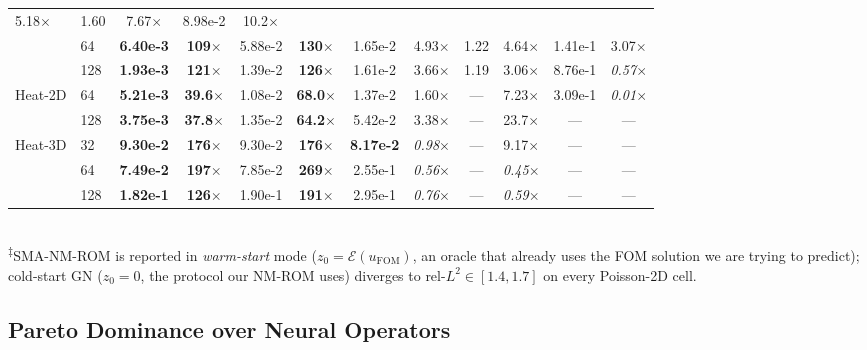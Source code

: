 \documentclass{article}
\begin{document}
\begin{table}[!htbp]
\begin{tabular}{llcccccccccc}
  5.18$\times$ & 1.60        & 7.67$\times$ & 8.98e-2 & 10.2$\times$ \\
    &  64 & \textbf{6.40e-3} & \textbf{109}$\times$  & 5.88e-2 & \textbf{130}$\times$ & 1.65e-2 &
  4.93$\times$ & 1.22        & 4.64$\times$ & 1.41e-1 & 3.07$\times$ \\
    & 128 & \textbf{1.93e-3} & \textbf{121}$\times$  & 1.39e-2 & \textbf{126}$\times$ & 1.61e-2 &
  3.66$\times$ & 1.19        & 3.06$\times$ & 8.76e-1 & \emph{0.57}$\times$ \\
  \midrule
  \multirow{2}{*}{Heat-2D}
    &  64 & \textbf{5.21e-3} & \textbf{39.6}$\times$  & 1.08e-2 & \textbf{68.0}$\times$  & 1.37e-2     &
  1.60$\times$        & ---        & 7.23$\times$ & 3.09e-1 & \emph{0.01}$\times$ \\
    & 128 & \textbf{3.75e-3} & \textbf{37.8}$\times$  & 1.35e-2 & \textbf{64.2}$\times$  & 5.42e-2     &
  3.38$\times$        & ---        & 23.7$\times$ & ---     & --- \\
  \midrule
  \multirow{3}{*}{Heat-3D}
    &  32 & \textbf{9.30e-2} & \textbf{176}$\times$   & 9.30e-2 & \textbf{176}$\times$   & \textbf{8.17e-2} &
  \emph{0.98}$\times$ & ---         & 9.17$\times$ & ---         & ---                 \\
    &  64 & \textbf{7.49e-2} & \textbf{197}$\times$   & 7.85e-2 & \textbf{269}$\times$   & 2.55e-1     &
  \emph{0.56}$\times$ & ---         & \emph{0.45}$\times$ & ---     & ---                 \\
    & 128 & \textbf{1.82e-1} & \textbf{126}$\times$   & 1.90e-1 & \textbf{191}$\times$   & 2.95e-1     &
  \emph{0.76}$\times$ & ---         & \emph{0.59}$\times$ & ---     & ---                 \\
  \bottomrule
  \end{tabular}
  \\[2pt]
  {\scriptsize \textsuperscript{$\ddagger$}SMA-NM-ROM \citep{KimChoi2022NMROM}
  is reported in \emph{warm-start} mode ($z_0=\mathcal{E}(u_\mathrm{FOM})$,
  an oracle that already uses the FOM solution we are trying to predict);
  cold-start GN ($z_0=0$, the protocol our NM-ROM uses) diverges to
  rel-$L^2 \in [1.4,1.7]$ on every Poisson-2D cell.}
  \end{table}

\subsection{Pareto Dominance over Neural Operators}\label{sec:results:operators}
\end{document}
